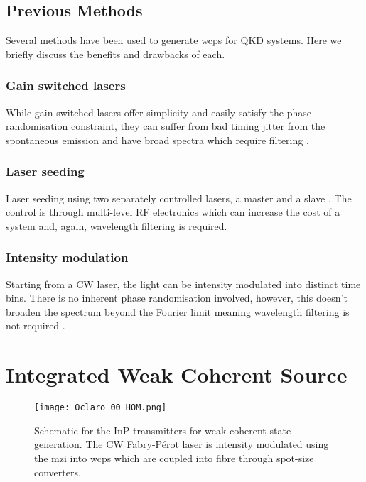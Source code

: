 \subsection{Previous Methods}

Several methods have been used to generate \acp{wcp} for \ac{QKD} systems. Here we briefly discuss the benefits and drawbacks of each.

\subsubsection*{Gain switched lasers}

While gain switched lasers offer simplicity and easily satisfy the phase randomisation constraint, they can suffer from bad timing jitter from the spontaneous emission and have broad spectra which require filtering \cite{Agnesi2019}.


\subsubsection*{Laser seeding}

Laser seeding using two separately controlled lasers, a master and a slave \cite{Comandar2016PLS}. The control is through multi-level RF electronics which can increase the cost of a system and, again, wavelength filtering is required.


\subsubsection*{Intensity modulation}

Starting from a \ac{CW} laser, the light can be intensity modulated into distinct time bins. There is no inherent phase randomisation involved, however, this doesn't broaden the spectrum beyond the Fourier limit meaning wavelength filtering is not required \cite{Sibson2017InP}.

\section{Integrated Weak Coherent Source}

\begin{figure}[tp]
	\centering
	\texttt{[image: Oclaro\_00\_HOM.png]}
	\caption[Schematic of the integrated transmitters for weak coherent state generation]{Schematic for the \ac{InP} transmitters for weak coherent state generation. The \ac{CW} Fabry-P\'{e}rot laser is intensity modulated using the \ac{mzi} into \acp{wcp} which are coupled into fibre through spot-size converters.}
	\label{fig:hom_chip}
\end{figure}

